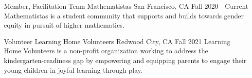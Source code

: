 \documentclass[../omelveny-cv]{subfiles}
\begin{document}


\begin{cventries}
    \cventry
    {Member, Facilitation Team} %
    {Mathematistas} %
    {San Francisco, CA} %
    {Fall 2020 - Current} %
    {
        Mathematistas is a student community that supports and builds towards gender equity in pursuit of higher mathematics.
    }


    \cventry
    {Volunteer} %
    {Learning Home Volunteers} %
    {Redwood City, CA} %
    {Fall 2021} %
    {
        Learning Home Volunteers is a non-profit organization working to address the kindergarten-readiness gap by empowering and equipping parents to engage their young children in joyful learning through play.
    }


\end{cventries}
\end{document}
